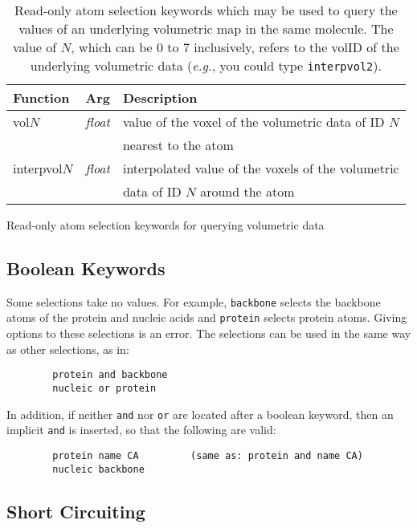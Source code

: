 \begin{table}[htb]
\begin{center}
\begin{tabular}{|l|c|l|} 
  \hline
  Function & Arg & Description\\ 
  \hline\hline
  vol$N$       & \emph{float} & value of the voxel of the volumetric data of ID $N$ \\
               & & nearest to the atom \\
  interpvol$N$ & \emph{float} & interpolated value of the voxels of the volumetric \\
               & & data of ID $N$ around the atom \\ 
  \hline
\end{tabular}
\end{center}
\caption{Read-only atom selection keywords which may be used to query the values
of an underlying volumetric map in the same molecule. The value of $N$, which
can be 0 to 7 inclusively, refers to the volID of the underlying volumetric data
(\emph{e.g.}, you could type {\tt interpvol2}).}{Read-only atom selection
keywords for querying volumetric data}
\label{table:ug:volkeywords}
\end{table}


\subsection{Boolean Keywords}

Some selections take no values.  For example, {\tt backbone}
selects the backbone atoms of the protein and nucleic acids and
{\tt protein} selects protein atoms.
Giving options to these selections is an error.
The selections can be used in the same way as other selections, as in:
\begin{verbatim}
        protein and backbone
        nucleic or protein
\end{verbatim}
In addition, if neither {\tt and} nor {\tt or} are located 
after a boolean keyword, then an implicit {\tt and} is inserted, so
that the following are valid:
\begin{verbatim}
        protein name CA         (same as: protein and name CA)
        nucleic backbone
\end{verbatim}

\subsection{Short Circuiting}
\label{ug:topic:selection:short_circuits}

